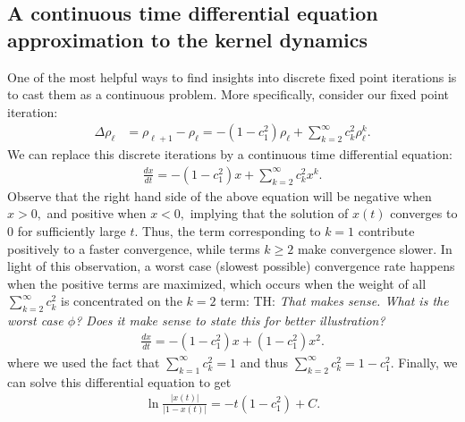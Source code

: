 \documentclass[twoside]{article}
\theoremstyle{definition}
\newcommand{\thomas}[1]{{\color{blue}TH:  \textit{#1}}}
\begin{document}
\subsection*{A continuous time differential equation approximation to the kernel dynamics} 
One of the most helpful ways to find insights into discrete fixed point iterations is to cast them as a continuous problem. More specifically, consider our fixed point iteration: 
\begin{align*}
    \Delta \rho_\ell &= \rho_{\ell+1} - \rho_\ell = -(1- c_1^2) \rho_\ell + \sum_{k=2}^\infty c_k^2 \rho^k_\ell.
\end{align*}
We can replace this discrete iterations by a continuous time differential equation:
\begin{align*}
    \frac{dx}{dt} = - (1-c_1^2)x + \sum_{k=2}^\infty c_k^2 x^k.
\end{align*}
Observe that the right hand side of the above equation will be negative when $x > 0,$ and positive when $x < 0,$ implying that the solution of $x(t)$ converges to $0$ for sufficiently large $t.$  Thus, the term corresponding to $k=1$ contribute positively to a faster convergence, while terms $k\ge 2$ make convergence slower. In light of this observation, a worst case (slowest possible) convergence rate happens when the positive terms are maximized, which occurs when the weight of all $\sum_{k=2}^\infty c_k^2 $ is concentrated on the $k=2$ term: \thomas{That makes sense. What is the worst case $\phi$? Does it make sense to state this for better illustration?}
\begin{align*}
    \frac{dx}{dt} =  -(1-c_1^2)x + (1-c_1^2) x^2.
\end{align*}
where we used the fact that $\sum_{k=1}^\infty c_k^2 = 1$ 
and thus $\sum_{k=2}^\infty c_k^2 = 1-c_1^2. $ Finally, we can solve this differential equation to get
\begin{align*}
    \ln \frac{|x(t)|}{|1-x(t)|} = -t (1-c_1^2) + C.
\end{align*}
\end{document}
